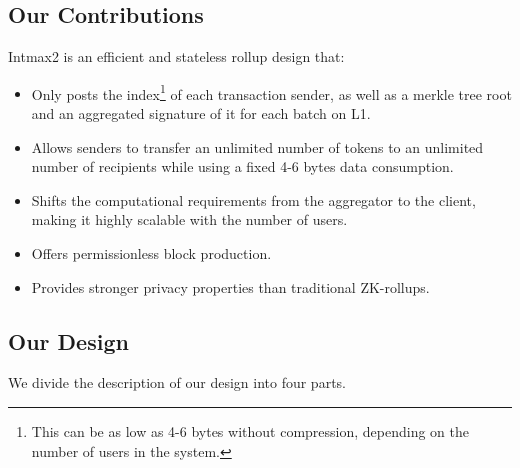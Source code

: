\subsection{Our Contributions}

Intmax2 is an efficient and stateless rollup design that:

\begin{itemize}
  \setlength\itemsep{0.35em}

    \item Only posts the index\footnote{This can be as low as 4-6 bytes without compression, depending on the number of users in the system.} of each transaction sender, as well as a merkle tree root and an aggregated signature of it for each batch on L1.

    \item Allows senders to transfer an unlimited number of tokens to an unlimited number of recipients while using a fixed 4-6 bytes data consumption.

    \item Shifts the computational requirements from the aggregator to the client, making it highly scalable with the number of users.

    \item Offers permissionless block production.

    \item Provides stronger privacy properties than traditional ZK-rollups.
  
\end{itemize}

\subsection{Our Design}

We divide the description of our design into four parts.

